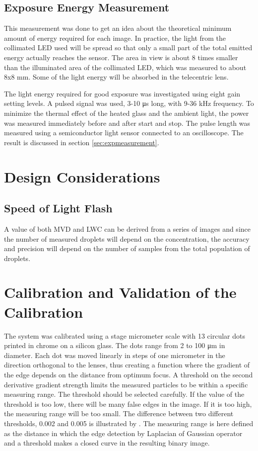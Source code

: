 \subsection{Exposure Energy Measurement}

This measurement was done to get an idea about the theoretical minimum amount of energy required for each image. In practice, the light from the collimated LED used will be spread so that only a small part of the total emitted energy actually reaches the sensor. The area in view is about 8 times smaller than the illuminated area of the collimated LED, which was measured to about 8x8 mm. Some of the light energy will be absorbed in the telecentric lens.

The light energy required for good exposure was investigated using eight gain setting levels. A pulsed signal was used, 3-10 μs long, with 9-36 kHz frequency. To minimize the thermal effect of the heated glass and the ambient light, the power was measured immediately before and after start and stop. The pulse length was measured using a semiconductor light sensor connected to an oscilloscope. The result is discussed in section \ref{sec:expmeasurement}.

\section{Design Considerations}

\subsection{Speed of Light Flash}

A value of both MVD and LWC can be derived from a series of images and since the number of measured droplets will depend on the concentration, the accuracy and precision will depend on the number of samples from the total population of droplets.

\section{Calibration and Validation of the Calibration}

The system was calibrated using a stage micrometer scale with 13 circular dots printed in chrome on a silicon glass. The dots range from 2 to 100 μm in diameter. Each dot was moved linearly in steps of one micrometer in the direction orthogonal to the lenses, thus creating a function where the gradient of the edge depends on the distance from optimum focus. A threshold on the second derivative gradient strength limits the measured particles to be within a specific measuring range. The threshold should be selected carefully. If the value of the threshold is too low, there will be many false edges in the image. If it is too high, the measuring range will be too small. The difference between two different thresholds, 0.002 and 0.005 is illustrated by .  The measuring range is here defined as the distance in which the edge detection by Laplacian of Gaussian operator and a threshold makes a closed curve in the resulting binary image.

